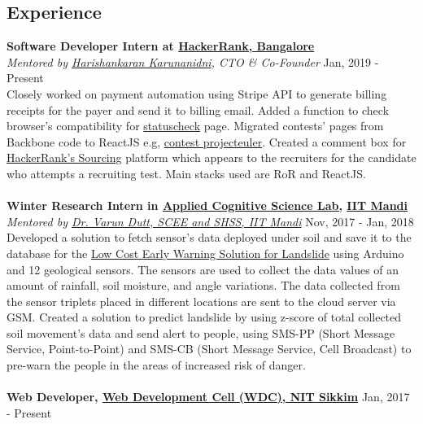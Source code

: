 \documentclass[margin, centered]{res}
\begin{document}
\begin{resume}
        \section{Experience}
            \textbf{Software Developer Intern at \href{https://www.hackerrank.com}{HackerRank, Bangalore}} \\
            \emph{Mentored by \href{https://www.hackerrank.com/about-us/our-team/}{Harishankaran 
            Karunanidni}\footnotesize{, CTO \& Co-Founder}} \hfill Jan, 2019 - Present \\
            Closely worked on payment automation using Stripe API to generate billing receipts for the payer and send it to billing email. Added a function to check browser's compatibility for \href{https://www.hackerrank.com/statuscheck}{statuscheck} page. Migrated contests' pages from Backbone code to ReactJS e.g, \href{https://www.hackerrank.com/projecteuler/}{contest projecteuler}. Created a comment box for \href{https://www.hackerrank.com/work}{HackerRank's Sourcing} platform which appears to the recruiters for the candidate who attempts a recruiting test. Main stacks used are RoR and ReactJS. \\
            \\
            \textbf{Winter Research Intern in \href{http://acslab.org}{Applied Cognitive Science Lab,} \href{https://iitmandi.ac.in/}{IIT Mandi}} \\
            \emph{Mentored by \href{https://faculty.iitmandi.ac.in/~varun/}{Dr. Varun Dutt, SCEE and SHSS, IIT Mandi}} \hfill Nov, 2017 - Jan, 2018 \\
            Developed a solution to fetch sensor’s data deployed under soil and save it to the database for the
            \href{http://landslidemonitoring.esy.es/}{Low Cost Early Warning Solution for Landslide} using Arduino
            and 12 geological sensors. The sensors are used to collect the data values of an amount of rainfall,
            soil moisture, and angle variations. The data collected from the sensor triplets placed in different
            locations are sent to the cloud server via GSM. Created a solution to predict landslide by using z-score
            of total collected soil movement’s data and send alert to people, using SMS-PP (Short Message Service,
            Point-to-Point) and SMS-CB (Short Message Service, Cell Broadcast) to pre-warn the people in the areas
            of increased risk of danger. \\
            \\
            \textbf{Web Developer, \href{https://nitsikkim.ac.in/webdevelopmentcell}{Web Development Cell (WDC), NIT Sikkim}} \hfill Jan, 2017 - Present \\

\end{resume}
\end{document}
